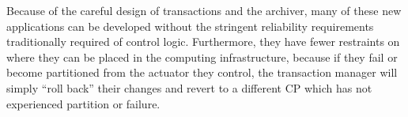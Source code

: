 Because of the careful design of transactions and the archiver, many of these new applications can be developed without the stringent reliability requirements traditionally required of control logic.  Furthermore, they have fewer restraints on where they can be placed in the computing infrastructure, because if they fail or become partitioned from the actuator they control, the transaction manager will simply ``roll back'' their changes and revert to a different CP which has not experienced partition or failure.
